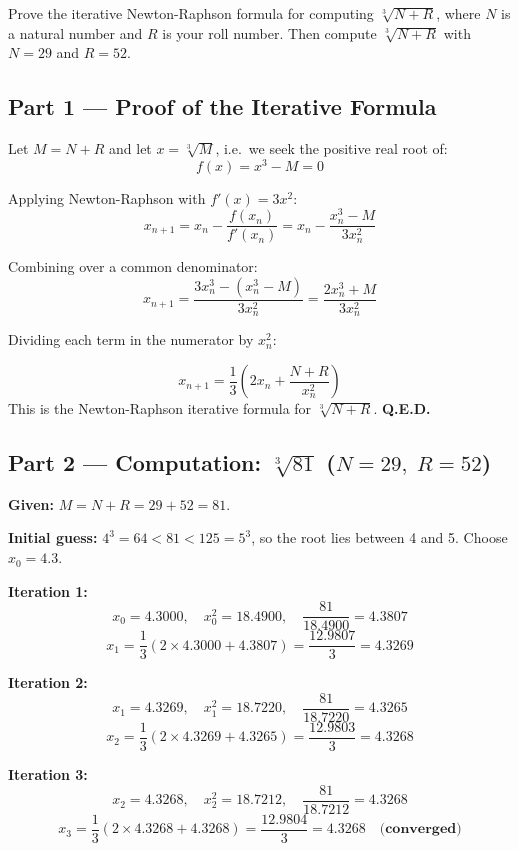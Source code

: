 \documentclass[12pt]{article}
\begin{document}
\begin{problembox}
Prove the iterative Newton-Raphson formula for computing $\sqrt[3]{N+R}$, where $N$ is a natural number and $R$ is your roll number. Then compute $\sqrt[3]{N+R}$ with $N = 29$ and $R = 52$.
\end{problembox}

\subsection*{Part 1 --- Proof of the Iterative Formula}

Let $M = N + R$ and let $x = \sqrt[3]{M}$, i.e.\ we seek the positive real root of:
\[
  f(x) = x^3 - M = 0
\]

Applying Newton-Raphson with $f'(x) = 3x^2$:
\[
  x_{n+1} = x_n - \frac{f(x_n)}{f'(x_n)} = x_n - \frac{x_n^3 - M}{3x_n^2}
\]

Combining over a common denominator:
\[
  x_{n+1} = \frac{3x_n^3 - (x_n^3 - M)}{3x_n^2} = \frac{2x_n^3 + M}{3x_n^2}
\]

Dividing each term in the numerator by $x_n^2$:

\begin{formulabox}
\[
  \boxed{x_{n+1} = \dfrac{1}{3}\!\left(2x_n + \dfrac{N+R}{x_n^2}\right)}
\]
This is the Newton-Raphson iterative formula for $\sqrt[3]{N+R}$. \quad \textbf{Q.E.D.}
\end{formulabox}

\vspace{8pt}

\subsection*{Part 2 --- Computation: $\sqrt[3]{81}$ \quad ($N=29,\; R=52$)}

\textbf{Given:} $M = N + R = 29 + 52 = 81$.

\medskip
\textbf{Initial guess:} $4^3 = 64 < 81 < 125 = 5^3$, so the root lies between 4 and 5. Choose $x_0 = 4.3$.

\medskip
\noindent\textbf{Iteration 1:}
\[
  x_0 = 4.3000,\quad x_0^2 = 18.4900,\quad \frac{81}{18.4900} = 4.3807
\]
\[
  x_1 = \frac{1}{3}(2 \times 4.3000 + 4.3807) = \frac{12.9807}{3} = \mathbf{4.3269}
\]

\noindent\textbf{Iteration 2:}
\[
  x_1 = 4.3269,\quad x_1^2 = 18.7220,\quad \frac{81}{18.7220} = 4.3265
\]
\[
  x_2 = \frac{1}{3}(2 \times 4.3269 + 4.3265) = \frac{12.9803}{3} = \mathbf{4.3268}
\]

\noindent\textbf{Iteration 3:}
\[
  x_2 = 4.3268,\quad x_2^2 = 18.7212,\quad \frac{81}{18.7212} = 4.3268
\]
\[
  x_3 = \frac{1}{3}(2 \times 4.3268 + 4.3268) = \frac{12.9804}{3} = \mathbf{4.3268} \quad \textbf{(converged)}
\]
\end{document}
